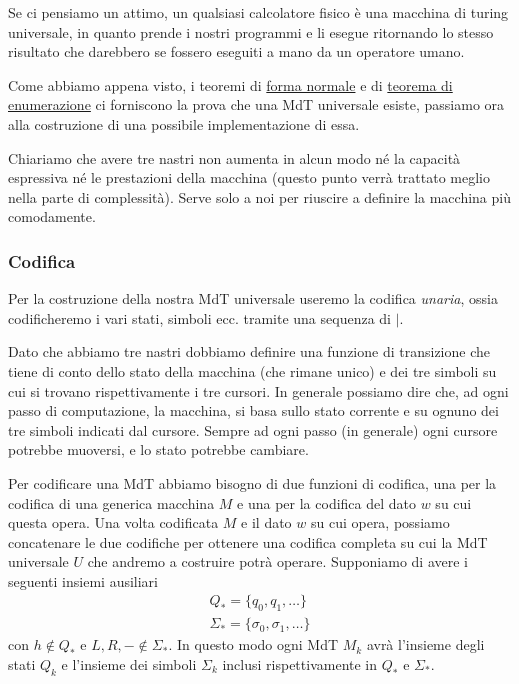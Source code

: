 Se ci pensiamo un attimo, un qualsiasi calcolatore fisico è una
macchina di turing universale, in quanto prende i nostri
programmi e li esegue ritornando lo stesso risultato che
darebbero se fossero eseguiti a mano da un operatore umano.

Come abbiamo appena visto, i teoremi di
\hyperref[th: fn]{forma normale} e di
\hyperref[th: enum]{teorema di enumerazione} ci forniscono la
prova che una MdT universale esiste, passiamo ora alla
costruzione di una possibile implementazione di essa.

Chiariamo che avere tre nastri non aumenta in alcun modo né la
capacità espressiva né le prestazioni della macchina (questo
punto verrà trattato meglio nella parte di complessità). Serve
solo a noi per riuscire a definire la macchina più comodamente.

\subsubsection{Codifica}
Per la costruzione della nostra MdT universale useremo la
codifica \emph{unaria}, ossia codificheremo i vari stati, simboli
ecc. tramite una sequenza di $\mid$.

Dato che abbiamo tre nastri dobbiamo definire una funzione di
transizione che tiene di conto dello stato della macchina (che
rimane unico) e dei tre simboli su cui si trovano rispettivamente
i tre cursori. In generale possiamo dire che, ad ogni passo di
computazione, la macchina, si basa sullo stato corrente e su
ognuno dei tre simboli indicati dal cursore. Sempre ad ogni passo
(in generale) ogni cursore potrebbe muoversi, e lo stato potrebbe
cambiare.

Per codificare una MdT abbiamo bisogno di due funzioni di
codifica, una per la codifica di una generica macchina $M$ e una
per la codifica del dato $w$ su cui questa opera. Una volta
codificata $M$ e il dato $w$ su cui opera, possiamo concatenare
le due codifiche per ottenere una codifica completa su cui la
MdT universale $U$ che andremo a costruire potrà operare.
Supponiamo di avere i seguenti insiemi ausiliari
\begin{gather*}
	Q_* = \{ q_0, q_1, \dots \} \\
	\Sigma_* = \{ \sigma_0, \sigma_1, \dots \}
\end{gather*}
con $h \notin Q_*$ e $L, R, - \notin \Sigma_*$. In questo modo
ogni MdT $M_k$ avrà l'insieme degli stati $Q_k$ e l'insieme dei
simboli $\Sigma_k$ inclusi rispettivamente in $Q_*$ e $\Sigma_*$.

